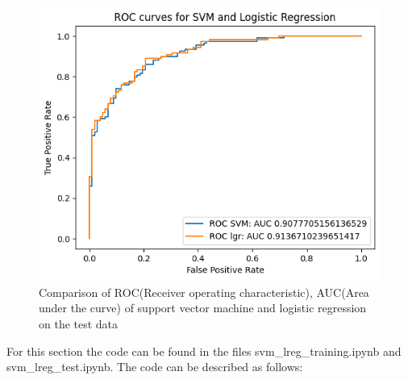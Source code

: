 \documentclass{cernatsnote}
\begin{document}
\begin{figure}
    \centering
    \includegraphics[width=0.8\linewidth]{images/ROC_test_SVM_and_lreg.png}
    \caption{Comparison of ROC(Receiver operating characteristic), AUC(Area under the curve) of support vector machine and logistic regression on the test data}
    \label{ROC_test_SVM_and_lreg}
\end{figure}

For this section the code can be found in the files svm\_lreg\_training.ipynb and\\ svm\_lreg\_test.ipynb. The code can be described as follows:
\end{document}

